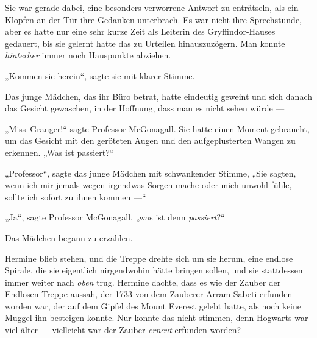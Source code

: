 Sie war gerade dabei, eine besonders verworrene Antwort zu enträtseln, als ein Klopfen an der Tür ihre Gedanken unterbrach. Es war nicht ihre Sprechstunde, aber es hatte nur eine sehr kurze Zeit als Leiterin des Gryffindor-Hauses gedauert, bis sie gelernt hatte das zu Urteilen hinauszuzögern. Man konnte \emph{hinterher} immer noch Hauspunkte abziehen.

„Kommen sie herein“, sagte sie mit klarer Stimme.

Das junge Mädchen, das ihr Büro betrat, hatte eindeutig geweint und sich danach das Gesicht gewaschen, in der Hoffnung, dass man es nicht sehen würde —

„Miss~Granger!“ sagte Professor McGonagall. Sie hatte einen Moment gebraucht, um das Gesicht mit den geröteten Augen und den aufgeplusterten Wangen zu erkennen.
„Was ist passiert?“

„Professor“, sagte das junge Mädchen mit schwankender Stimme,
„Sie sagten, wenn ich mir jemals wegen irgendwas Sorgen mache oder mich unwohl fühle, sollte ich sofort zu ihnen kommen —“

„Ja“, sagte Professor McGonagall, „was ist denn \emph{passiert}?“

Das Mädchen begann zu erzählen.

\later

Hermine blieb stehen, und die Treppe drehte sich um sie herum, eine endlose Spirale, die sie eigentlich nirgendwohin hätte bringen sollen, und sie stattdessen immer weiter nach \emph{oben} trug. Hermine dachte, dass es wie der Zauber der Endlosen Treppe aussah, der 1733 von dem Zauberer Arram Sabeti erfunden worden war, der auf dem Gipfel des Mount Everest gelebt hatte, als noch keine Muggel ihn besteigen konnte. Nur konnte das nicht stimmen, denn Hogwarts war viel älter — vielleicht war der Zauber \emph{erneut} erfunden worden?

